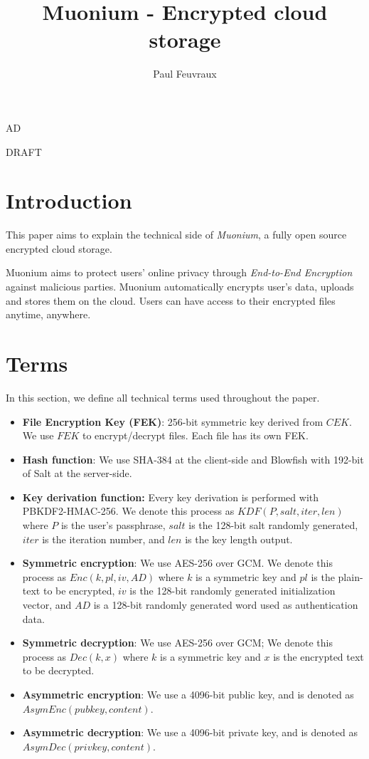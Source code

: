 AD\documentclass[a4paper,10pt]{article}
\title{Muonium - Encrypted cloud storage}
\author{Paul Feuvraux}
\begin{document}
\maketitle

DRAFT


\section{Introduction}
This paper aims to explain the technical side of \emph{Muonium}, a fully open source encrypted cloud storage.


Muonium aims to protect users' online privacy through \emph{End-to-End Encryption} against malicious parties.
Muonium automatically encrypts user's data, uploads and stores them on the cloud. Users can have access to their encrypted files anytime, anywhere.

\section{Terms}
In this section, we define all technical terms used throughout the paper.

\begin{itemize}
    \item \textbf{File Encryption Key (FEK)}:
        256-bit symmetric key derived from $CEK$. We use $FEK$ to encrypt/decrypt files. Each file has its own FEK.
    \item \textbf{Hash function}: We use SHA-384 at the client-side and Blowfish with 192-bit of Salt at the server-side.
    \item \textbf{Key derivation function:} Every key derivation is performed with PBKDF2-HMAC-256. We denote this process as
		$KDF(P,salt, iter, len)$ where $P$ is the user's passphrase, $salt$ is the 128-bit salt randomly generated, $iter$ is the
		iteration number, and $len$ is the key length output.
    \item \textbf{Symmetric encryption}: We use AES-256 over GCM.
        We denote this process as $Enc(k,pl, iv, AD)$ where $k$ is a symmetric key and $pl$ is the plain-text to be encrypted,
				$iv$ is the 128-bit randomly generated initialization vector, and $AD$ is a 128-bit randomly generated word used as
				authentication data.
    \item \textbf{Symmetric decryption}: We use AES-256 over GCM;
        We denote this process as $Dec(k, x)$ where $k$ is a symmetric key and $x$ is the encrypted text to be decrypted.
		\item \textbf{Asymmetric encryption}: We use a 4096-bit public key, and is denoted as $AsymEnc(pubkey, content)$.
		\item \textbf{Asymmetric decryption}: We use a 4096-bit private key, and is denoted as $AsymDec(privkey, content)$.
\end{itemize}
\end{document}

